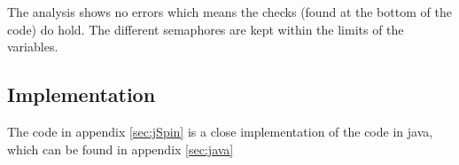 The analysis shows no errors which means the checks (found at the bottom of the code) do hold. The different semaphores are kept within the limits of the variables. 

\subsection{Implementation}
The code in appendix \ref{sec:jSpin} is a close implementation of the code in java, which can be found in appendix \ref{sec:java}